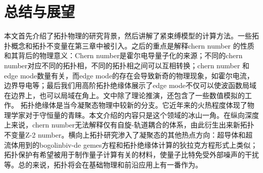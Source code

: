 \chapter{总结与展望}
本文首先介绍了拓扑物理的研究背景，然后讲解了紧束缚模型的计算方法。一些拓扑概念和拓扑不变量在第三章中被引入。之后的重点是解释chern number 的性质和其背后的物理意义：Chern number是霍尔电导量子化的来源；不同的chern number对应不同的拓扑相，不同的拓扑相之间可以互相转换；chern number 和edge mode数量有关，而edge mode的存在会导致新奇的物理现象，如霍尔电流，边界导电等；最后我们用高阶拓扑绝缘体展示了edge mode不仅可以使波函数局域在边界上，也可以局域在角上。文中除了理论推演，还包含了一些数值模拟的工作。
拓扑绝缘体是当今凝聚态物理中较新的分支。它近年来的火热程度体现了物理学家对于守恒量的青睐。本文介绍的内容只是这个领域的冰山一角。在纵向深度上来说，chern number无法解释仅有自旋-轨道耦合的体系，由此衍生出来新拓扑不变量Z-2 number。横向上拓扑研究渗入了凝聚态的其他热点方向：超导体和超流体用到的bogolinbiv-de gemes方程和拓扑绝缘体计算的狄拉克方程形式上类似；拓扑保护有希望被用于制作量子计算有关的材料，使量子比特免受外部噪声的干扰等。总的来说，拓扑将会在基础物理和前沿应用上有一番作为。